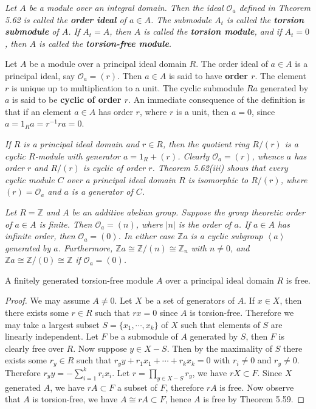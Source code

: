 \begin{note}\em
Let $A$ be a module over an integral domain. Then the ideal $\mathcal{O}_a$ defined in Theorem 5.62 is called the \textbf{order ideal} of $a\in A$. The submodule $A_t$ is called the \textbf{torsion submodule} of $A$. If $A_t=A$, then $A$ is called the \textbf{torsion module}, and if $A_t=0$, then $A$ is called the \textbf{torsion-free module}.
\end{note}
Let $A$ be a module over a principal ideal domain $R$. The order ideal of $a\in A$ is a principal ideal, say $\mathcal{O}_a=(r)$. Then $a\in A$ is said to have \textbf{order $r$}. The element $r$ is unique up to multiplication to a unit. The cyclic submodule $Ra$ generated by $a$ is said to be \textbf{cyclic of order $r$}. An immediate consequence of the definition is that if an element $a\in A$ has order $r$, where $r$ is a unit, then $a=0$, since $a=1_Ra=r^{-1}ra=0$.\par
\begin{example}\em
If $R$ is a principal ideal domain and $r\in R$, then the quotient ring $R/(r)$ is a cyclic $R$-module with generator $a=1_R+(r)$. Clearly $\mathcal{O}_a=(r)$, whence $a$ has order $r$ and $R/(r)$ is cyclic of order $r$. Theorem 5.62(iii) shows that every cyclic module $C$ over a principal ideal domain $R$ is isomorphic to $R/(r)$, where $(r)=\mathcal{O}_a$ and $a$ is a generator of $C$.
\end{example}
\begin{example}\em
Let $R=\mathbb{Z}$ and $A$ be an additive abelian group. Suppose the group theoretic order of $a\in A$ is finite. Then $\mathcal{O}_a=(n)$, where $|n|$ is the order of $a$. If $a\in A$ has infinite order, then $\mathcal{O}_a=(0)$. In either case $\mathbb{Z}a$ is a cyclic subgroup $\left<a\right>$ generated by $a$. Furthermore, $\mathbb{Z}a\cong\mathbb{Z}/(n)\cong\mathbb{Z}_n$ with $n\ne 0$, and $\mathbb{Z}a\cong\mathbb{Z}/(0)\cong\mathbb{Z}$ if $\mathcal{O}_a=(0)$.
\end{example}
\begin{theorem}
A finitely generated torsion-free module $A$ over a principal ideal domain $R$ is free.
\end{theorem}
\begin{proof}
We may assume $A\ne 0$. Let $X$ be a set of generators of $A$. If $x\in X$, then there exists some $r\in R$ such that $rx=0$ since $A$ is torsion-free. Therefore we may take a largest subset $S=\{x_1,\cdots,x_k\}$ of $X$ such that elements of $S$ are linearly independent. Let $F$ be a submodule of $A$ generated by $S$, then $F$ is clearly free over $R$. Now suppose $y\in X-S$. Then by the maximality of $S$ there exists some $r_y\in R$ such that $r_yy+r_1x_1+\cdots+r_kx_k=0$ with $r_i\ne 0$ and $r_y\ne 0$. Therefore $r_yy=-\sum_{i=1}^kr_ix_i$. Let $r=\prod_{y\in X-S}r_y$, we have $rX\subset F$. Since $X$ generated $A$, we have $rA\subset F$ a subset of $F$, therefore $rA$ is free. Now observe that $A$ is torsion-free, we have $A\cong rA\subset F$, hence $A$ is free by Theorem 5.59.
\end{proof}
